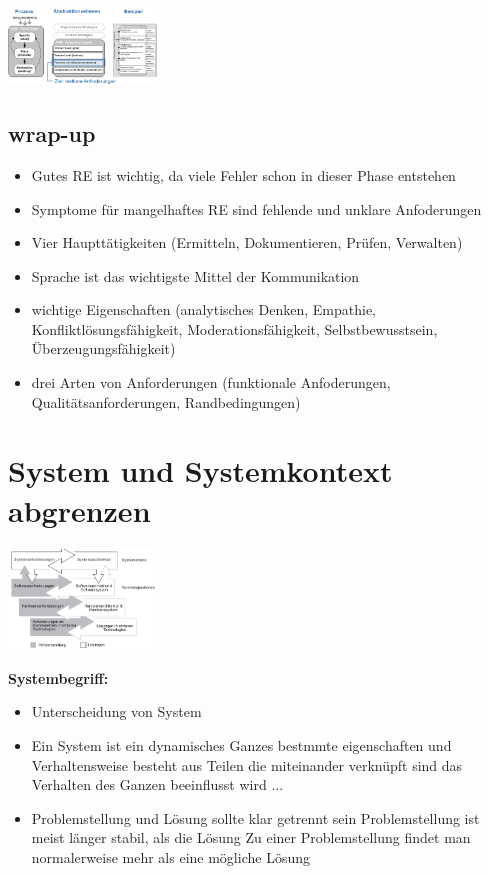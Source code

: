 \documentclass{report}
\newenvironment{Figure}
	{\par\medskip\noindent\minipage{\linewidth}}
	{\endminipage\par\medskip}
\theoremstyle{definition}
\theoremstyle{example}
\begin{document}
   \begin{Figure}
      \centering
       \includegraphics[width=150px]{img/AnforderungsEbene.png}
           \label{fig:Detaillierungsebene}
   \end{Figure}

\subsection{wrap-up}
\begin{itemize}
   \item Gutes RE ist wichtig, da viele Fehler schon in dieser Phase entstehen
   \item Symptome für mangelhaftes RE sind fehlende und unklare Anfoderungen
   \item Vier Haupttätigkeiten (Ermitteln, Dokumentieren, Prüfen, Verwalten)
   \item Sprache ist das wichtigste Mittel der Kommunikation
   \item wichtige Eigenschaften (analytisches Denken, Empathie, Konfliktlösungsfähigkeit, Moderationsfähigkeit, Selbstbewusstsein, Überzeugungsfähigkeit)
   \item drei Arten von Anforderungen (funktionale Anfoderungen, Qualitätsanforderungen, Randbedingungen)
\end{itemize}

\section{System und Systemkontext abgrenzen}
\begin{Figure}
   \centering
    \includegraphics[width=150px]{img/Systembegriffe.png}
        \label{fig:Uebersicht der Systembegriffe}
\end{Figure}

\textbf{Systembegriff:}
\begin{itemize}
   \item Unterscheidung von System 
   \item Ein System ist ein dynamisches Ganzes
   \subitem bestmmte eigenschaften und Verhaltensweise
   \subitem besteht aus Teilen die miteinander verknüpft sind
   \subitem das Verhalten des Ganzen beeinflusst wird ... 
   \item Problemstellung und Lösung sollte klar getrennt sein
   \subitem Problemstellung ist meist länger stabil, als die Lösung
   \subitem Zu einer Problemstellung findet man normalerweise mehr als eine mögliche Lösung 
\end{itemize}
\end{document}
